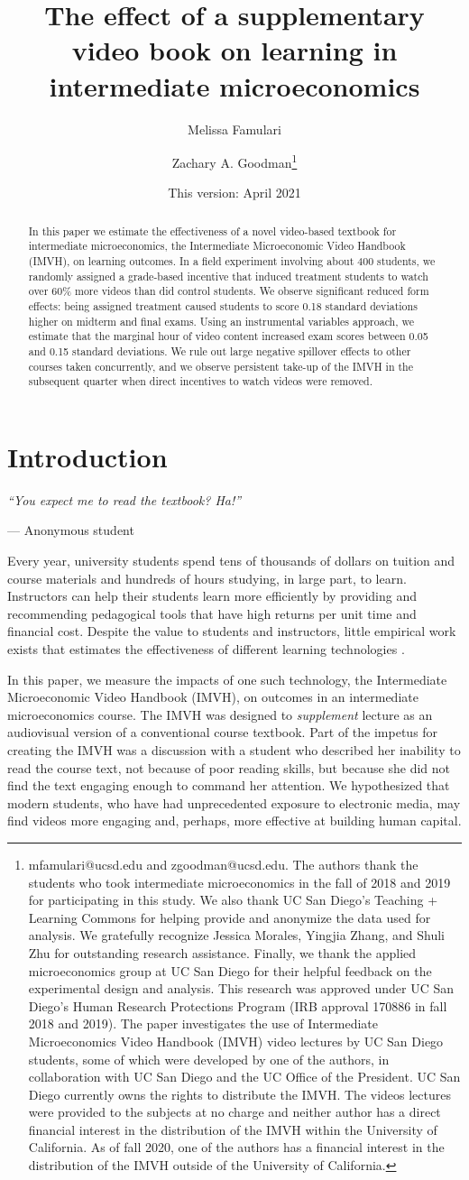 \documentclass[12pt]{article}
\title{The effect of a supplementary video book on learning in intermediate microeconomics}
\author{Melissa Famulari}
\author{Zachary A. Goodman\thanks{mfamulari@ucsd.edu and zgoodman@ucsd.edu. The authors thank the students who took intermediate microeconomics in the fall of 2018 and 2019 for participating in this study. We also thank UC San Diego's Teaching + Learning Commons for helping provide and anonymize the data used for analysis. We gratefully recognize Jessica Morales, Yingjia Zhang, and Shuli Zhu for outstanding research assistance. Finally, we thank the applied microeconomics group at UC San Diego for their helpful feedback on the experimental design and analysis. This research was approved under UC San Diego's Human Research Protections Program (IRB approval 170886 in fall 2018 and 2019). The paper investigates the use of Intermediate Microeconomics Video Handbook (IMVH) video lectures by UC San Diego students, some of which were developed by one of the authors, in collaboration with UC San Diego and the UC Office of the President. UC San Diego currently owns the rights to distribute the IMVH. The videos lectures were provided to the subjects at no charge and neither author has a direct financial interest in the distribution of the IMVH within the University of California. As of fall 2020, one of the authors has a financial interest in the distribution of the IMVH outside of the University of California.}}
\affil{University of California, San Diego}
\date{This version: April 2021} %
\begin{document}

\maketitle
\begin{abstract}
	In this paper we estimate the effectiveness of a novel video-based textbook for intermediate microeconomics, the Intermediate Microeconomic Video Handbook (IMVH), on learning outcomes. In a field experiment involving about 400 students, we randomly assigned a grade-based incentive that induced treatment students to watch over 60\% more videos than did control students. We observe significant reduced form effects: being assigned treatment caused students to score 0.18 standard deviations higher on midterm and final exams. Using an instrumental variables approach, we estimate that the marginal hour of video content increased exam scores between 0.05 and 0.15 standard deviations. We rule out large negative spillover effects to other courses taken concurrently, and we observe persistent take-up of the IMVH in the subsequent quarter when direct incentives to watch videos were removed.
\end{abstract}


\section{Introduction}

\epigraph{\textit{``You expect me to read the textbook? Ha!''}}{--- Anonymous student}\bigskip

Every year, university students spend tens of thousands of dollars on tuition and course materials and hundreds of hours studying, in large part, to learn. Instructors can help their students learn more efficiently by providing and recommending pedagogical tools that have high returns per unit time and financial cost. Despite the value to students and instructors, little empirical work exists that estimates the effectiveness of different learning technologies \parencite{aws2015}.

In this paper, we measure the impacts of one such technology, the Intermediate Microeconomic Video Handbook (IMVH), on outcomes in an intermediate microeconomics course. The IMVH was designed to \textit{supplement} lecture as an audiovisual version of a conventional course textbook. Part of the impetus for creating the IMVH was a discussion with a student who described her inability to read the course text, not because of poor reading skills, but because she did not find the text engaging enough to command her attention. We hypothesized that modern students, who have had unprecedented exposure to electronic media, may find videos more engaging and, perhaps, more effective at building human capital.
\end{document}
